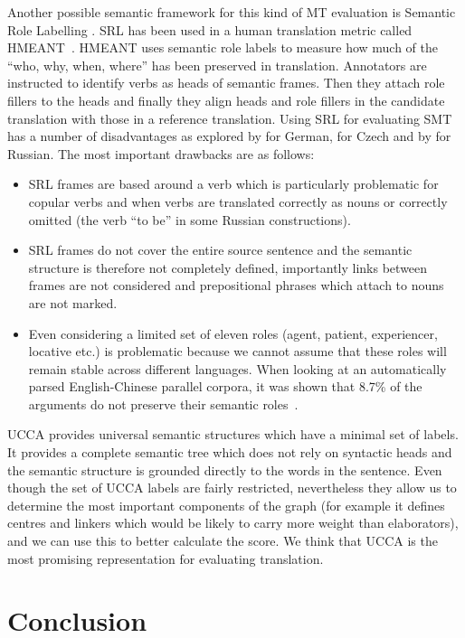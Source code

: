 \documentclass[11pt]{article}
\def\inparcite#1{\newcite{#1}}
\begin{document}
{Another possible semantic framework for this kind of MT evaluation is Semantic
Role Labelling 
\cite{palmer2010semantic}.
SRL has been used in a human translation metric called HMEANT~\cite{lo2011structured}. 
HMEANT uses semantic role labels
to measure how much of the “who, why, when,
where” has been preserved in translation. Annotators are instructed to identify verbs as
heads of semantic frames. Then they attach role
fillers to the heads and finally they align heads
and role fillers in the candidate translation with
those in a reference translation. Using SRL for evaluating SMT has a number of
disadvantages as explored by
 for German,  for
Czech and by  for Russian.
The most important drawbacks are as follows:
\begin{itemize}
\item SRL frames are based around a verb which is particularly problematic for
copular verbs and  when verbs are translated correctly as nouns or correctly
omitted (the verb ``to be'' in some Russian constructions).
\item SRL frames do not cover the entire source sentence and the semantic structure is
therefore not completely defined, importantly links between frames are not
considered and prepositional phrases which attach to nouns are not marked.
\item Even considering a limited set of eleven roles (agent, patient,
experiencer, locative etc.) is problematic because we cannot assume that these roles will 
 remain stable across different languages. 
 When looking at an automatically parsed  English-Chinese  parallel corpora,
 it was shown that 8.7\% of the arguments do not preserve their semantic roles~\cite{fung2006automatic}. 
\end{itemize}

UCCA provides universal semantic structures which 
have
a minimal set of labels. It provides a complete semantic tree which does not rely on syntactic heads and the semantic structure is grounded directly to the words in the sentence. 
 Even though the set of UCCA labels are fairly restricted,  nevertheless they allow us to determine the most important components of the graph (for example it defines centres and linkers which would be likely to carry more weight than elaborators), and we can use this to better calculate the score. 
We think that UCCA is the
most promising representation for evaluating translation. 
}

\section{Conclusion}





\end{document}
